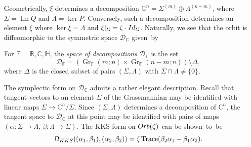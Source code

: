 \documentclass[11pt]{article}
\numberwithin{equation}{section}
\numberwithin{equation}{section}
\DeclareMathOperator{\Imag}{Im}
\DeclareMathOperator{\Gr}{Gr}
\DeclareMathOperator{\Tr}{Trace}
\newcommand{\R}{\mathbb{R}}
\newcommand{\C}{\mathbb{C}}
\newcommand{\D}{\mathcal{D}}
\newcommand{\Q}{\mathbb{H}}
\newcommand{\Id}{{\rm Id}}
\begin{document}
Geometrically, $\xi$ determines a decomposition $\C^n=\Sigma^{(m)}\oplus \Lambda^{(n-m)}$, where ${\Sigma=\Imag Q}$ and $\Lambda=\ker P$. Conversely, such a decomposition determines an element $\xi$ where $\ker\xi=\Lambda$ and ${\xi|_\Sigma=\zeta\cdot\Id_\Sigma}$. Naturally, we see that the orbit is diffeomorphic to the symmetric space $\D_\C$ given~by
\begin{Definition}
	For $\mathbb{F}=\R,\C,\Q$, the \emph{space of decompositions} $\D_\mathbb{F}$ is the set
	\begin{equation}
		\label{elegant_A+B}
		\D_\mathbb{F}=(\Gr_\mathbb{F}(m;n)\times \Gr_\mathbb{F}(n-m;n))\setminus\Delta,
	\end{equation}
	where $\Delta$ is the closed subset of pairs $(\Sigma,\Lambda)$ with $\Sigma\cap\Lambda\ne\{0\}$.
\end{Definition}
\begin{Remark}\label{elegant_rmk}
	The symplectic form on $\D_{\C}$ admits a rather elegant description. Recall that tangent vectors to an element $\Sigma$ of the Grassmannian may be identified with linear maps ${\Sigma\rightarrow\C^n/\Sigma}$. Since $(\Sigma,\Lambda)$ determines a decomposition of $\C^n$, the tangent space to $\D_{\C}$ at this point may be identified with pairs of maps $(\alpha\colon\Sigma\rightarrow\Lambda,\,\beta\colon \Lambda\rightarrow\Sigma)$. The KKS form on ${\rm Orb}(\zeta)$ can be shown~to~be
	\[
		\Omega_{\rm KKS}((\alpha_1,\beta_1),(\alpha_2,\beta_2))=\zeta\Tr(\beta_2\alpha_1-\beta_1\alpha_2).
	\]
\end{Remark}
\end{document}
